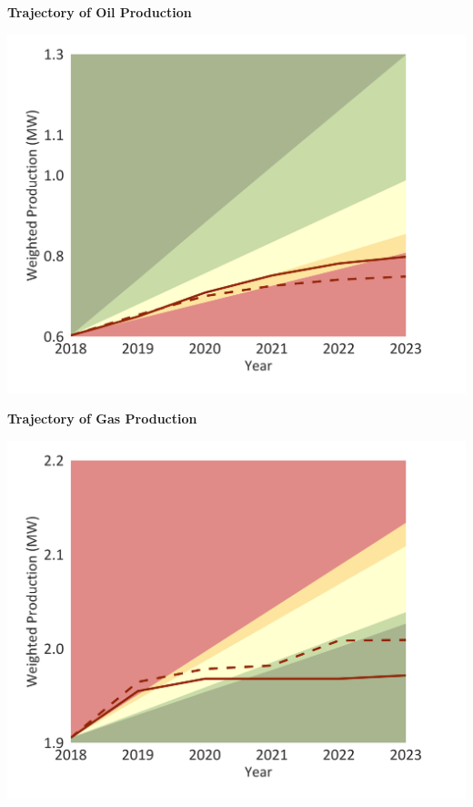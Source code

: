 \documentclass[10pt,table,a4]{article}\usepackage[]{graphicx}\usepackage[]{color}
\begin{document}
	\begin{minipage}[t]{.49\linewidth}
		\textbf{Trajectory of Oil Production }
		
		\includegraphics[trim = {0 0cm 0 0},width=1\linewidth]{CAFigures/Fig18}
		
	\end{minipage}	
	\hspace{.02\linewidth}
	\begin{minipage}[t]{.49\textwidth}
		\textbf{Trajectory of Gas Production }
		
		\includegraphics[trim = {0 0cm 0 0},width=1\linewidth]{CAFigures/Fig19}
		
	\end{minipage}
	
\end{document}
